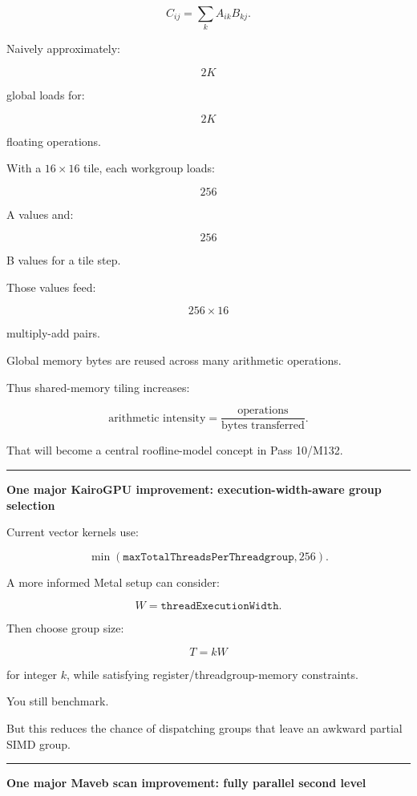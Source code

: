 \[
C_{ij}
=
\sum_k A_{ik}B_{kj}.
\]

Naively approximately:

\[
2K
\]

global loads for:

\[
2K
\]

floating operations.

With a \(16\times16\) tile, each workgroup loads:

\[
256
\]

A values and:

\[
256
\]

B values for a tile step.

Those values feed:

\[
256\times16
\]

multiply-add pairs.

Global memory bytes are reused across many arithmetic operations.

Thus shared-memory tiling increases:

\[
\boxed{
\text{arithmetic intensity}
=
\frac{
\text{operations}
}{
\text{bytes transferred}
}.
}
\]

That will become a central roofline-model concept in Pass 10/M132.

\begin{center}\rule{0.5\linewidth}{0.5pt}\end{center}

\textbf{One major KairoGPU improvement: execution-width-aware group selection}

Current vector kernels use:

\[
\min(
\texttt{maxTotalThreadsPerThreadgroup},
256
).
\]

A more informed Metal setup can consider:

\[
W=
\texttt{threadExecutionWidth}.
\]

Then choose group size:

\[
T=kW
\]

for integer \(k\), while satisfying register/threadgroup-memory constraints.

You still benchmark.

But this reduces the chance of dispatching groups that leave an awkward partial SIMD group.

\begin{center}\rule{0.5\linewidth}{0.5pt}\end{center}

\textbf{One major Maveb scan improvement: fully parallel second level}


